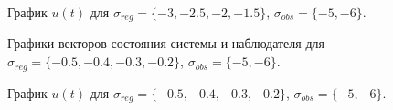 \begin{figure}[!h]
	\caption{График $u(t)$ для $\sigma_{reg} = \{ -3, -2.5, -2, -1.5\}$, $\sigma_{obs}= \{-5, -6 \}$.}
	\label{3_u_k2l2}
\end{figure}


\begin{figure}[!h]
	\caption{Графики векторов состояния системы и наблюдателя для $\sigma_{reg} = \{ -0.5, -0.4, -0.3, -0.2\}$, $\sigma_{obs}= \{-5, -6 \}$.}
	\label{3_x_k3l2}
\end{figure}

\begin{figure}[!h]
	\caption{График $u(t)$ для $\sigma_{reg} = \{ -0.5, -0.4, -0.3, -0.2\}$, $\sigma_{obs}= \{-5, -6 \}$.}
	\label{3_u_k3l2}
\end{figure}

\endinput